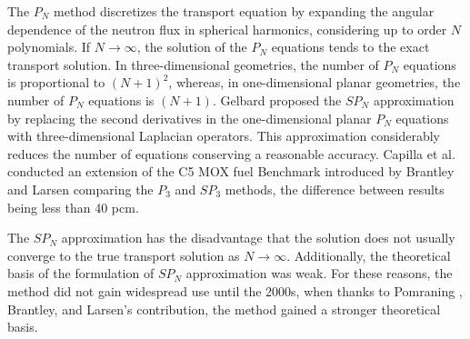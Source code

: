 \documentclass{anstrans}
\begin{document}
The $P_N$ method \cite{davidson_neutron_1957} discretizes the transport equation by expanding the angular dependence of the neutron flux in spherical harmonics, considering up to order $N$ polynomials.
If $N \rightarrow \infty$, the solution of the $P_N$ equations tends to the exact transport solution.
In three-dimensional geometries, the number of $P_N$ equations is proportional to $(N+1)^2$, whereas, in one-dimensional planar geometries, the number of $P_N$ equations is $(N+1)$.
Gelbard \cite{gelbard_spherical_1960} proposed the $SP_N$ approximation by replacing the second derivatives in the one-dimensional planar $P_N$ equations with three-dimensional Laplacian operators.
This approximation considerably reduces the number of equations conserving a reasonable accuracy.
Capilla et al. \cite{capilla_applications_2009} conducted an extension of the C5 \gls{MOX} fuel Benchmark \cite{cavarec_benchmark_1994} introduced by Brantley and Larsen \cite{brantley_simplifiedP3_2000} comparing the $P_3$ and $SP_3$ methods, the difference between results being less than 40 pcm.

The $SP_N$ approximation has the disadvantage that the solution does not usually converge to the true transport solution as $N \rightarrow \infty$.
Additionally, the theoretical basis of the formulation of $SP_N$ approximation was weak.
For these reasons, the method did not gain widespread use until the 2000s, when thanks to Pomraning \cite{pomraning_asymptotic_1993}, Brantley, and Larsen's \cite{brantley_simplifiedP3_2000} contribution, the method gained a stronger theoretical basis.
\end{document}

